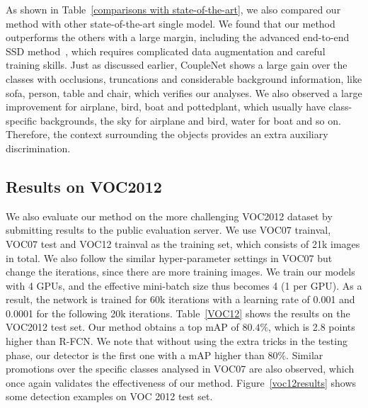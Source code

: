 \documentclass[10pt,twocolumn,letterpaper]{article}
\begin{document}
As shown in Table~\ref{comparisons with state-of-the-art}, we also compared our method with other state-of-the-art single model. We found that our method outperforms the others with a large margin, including the advanced end-to-end SSD method~\cite{liu2016ssd}, which requires complicated data augmentation and careful training skills. Just as discussed earlier, CoupleNet shows a large gain over the classes with occlusions, truncations and considerable background information, like sofa, person, table and chair, which verifies our analyses. We also observed a large improvement for airplane, bird, boat and pottedplant, which usually have class-specific backgrounds, \ie the sky for airplane and bird, water for boat and so on. Therefore, the context surrounding the objects provides an extra auxiliary discrimination.

\subsection{Results on VOC2012}
We also evaluate our method on the more challenging VOC2012 dataset by submitting results to the public evaluation server. We use VOC07 trainval, VOC07 test and VOC12 trainval as the training set, which consists of 21k images in total. We also follow the similar hyper-parameter settings in VOC07 but change the iterations, since there are more training images. We train our models with 4 GPUs, and the effective mini-batch size thus becomes 4 (1 per GPU). As a result, the network is trained for 60k iterations with a learning rate of 0.001 and 0.0001 for the following 20k iterations. Table~\ref{VOC12} shows the results on the VOC2012 test set. Our method obtains a top mAP of $80.4\%$, which is 2.8 points higher than R-FCN. We note that without using the extra tricks in the testing phase, our detector is the first one with a mAP higher than $80\%$. Similar promotions over the specific classes analysed in VOC07 are also observed, which once again validates the effectiveness of our method. Figure~\ref{voc12results} shows some detection examples on VOC 2012 test set.
\end{document}
